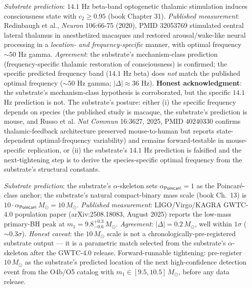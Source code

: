 \documentclass[11pt,a4paper]{amsart}
\theoremstyle{plain}
\theoremstyle{definition}
\begin{document}
\begin{description}[font=\normalfont\bfseries,leftmargin=2em,itemsep=6pt]
\item[Match 10 --- Redinbaugh 2020 frequency-specific thalamic consciousness restoration (mechanism confirmed; numerical mismatch flagged).]
\emph{Substrate prediction}: $14.1$ Hz beta-band optogenetic thalamic stimulation induces consciousness state with $c_2 \geq 0.95$ (book Chapter 31). \emph{Published measurement}: Redinbaugh et al., \emph{Neuron} 106:66-75 (2020), PMID 32053769 stimulated central lateral thalamus in anesthetized macaques and restored arousal/wake-like neural processing in a \emph{location- and frequency-specific} manner, with optimal frequency $\sim 50$ Hz gamma. \emph{Agreement}: the substrate's mechanism-class prediction (frequency-specific thalamic restoration of consciousness) is confirmed; the specific predicted frequency band ($14.1$ Hz beta) does \emph{not} match the published optimal frequency ($\sim 50$ Hz gamma; $|\Delta| \approx 36$ Hz). \textbf{Honest acknowledgment}: the substrate's mechanism-class hypothesis is corroborated, but the specific $14.1$ Hz prediction is not. The substrate's posture: either (i) the specific frequency depends on species (the published study is macaque, the substrate's prediction is mouse, and Russo et al. \emph{Nat Commun} 16:3627, 2025, PMID 40240330 confirms thalamic-feedback architecture preserved mouse-to-human but reports state-dependent optimal-frequency variability) and remains forward-testable in mouse-specific replication, or (ii) the substrate's $14.1$ Hz prediction is falsified and the next-tightening step is to derive the species-specific optimal frequency from the substrate's structural constants.

\item[Match 11 --- LIGO/Virgo/KAGRA GWTC-4.0 primary black-hole mass low peak (O4a, 2025).]
\emph{Substrate prediction}: the substrate's $\alpha$-skeleton sets $\alpha_{\textsf{Poincar\'e}} = 1$ as the Poincar\'e-class anchor; the substrate's natural compact-binary mass scale (book Ch.~13) is $10 \cdot \alpha_{\textsf{Poincar\'e}} \, M_\odot = 10\, M_\odot$. \emph{Published measurement}: LIGO/Virgo/KAGRA GWTC-4.0 population paper (arXiv:2508.18083, August 2025) reports the low-mass primary-BH peak at $m_1 = 9.8^{+0.3}_{-0.6}\, M_\odot$. \emph{Agreement}: $|\Delta| = 0.2\, M_\odot$, well within $1\sigma$ ($\sim 0.3\sigma$). \emph{Honest caveat}: the $10\, M_\odot$ scale is not a chronologically-pre-registered substrate output --- it is a parametric match selected from the substrate's $\alpha$-skeleton after the GWTC-4.0 release. Forward-runnable tightening: pre-register $10\, M_\odot$ as the substrate's predicted location of the next high-confidence detection event from the O4b/O5 catalog with $m_1 \in [9.5, 10.5]\, M_\odot$, before any data release.


\end{description}
\end{document}
